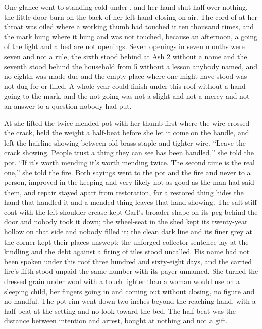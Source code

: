 One glance went to  standing cold under , and her hand shut half over nothing, the little-door burn on the back of her left hand closing on air. The cord of  at her throat was oiled where a working thumb had touched it ten thousand times, and the mark hung where it hung and was not touched, because an afternoon, a going of the light and a bed are not openings. Seven openings in seven months were seven and not a rule, the sixth stood behind at Ash 2 without a name and the seventh stood behind the household from  5 without a lesson anybody named, and no eighth was made due and the empty place where one might have stood was not dug for or filled. A whole year could finish under this roof without a hand going to the mark, and the not-going was not a slight and not a mercy and not an answer to a question nobody had put.

At  she lifted the twice-mended pot with her thumb first where the wire crossed the crack, held the weight a half-beat before she let it come on the handle, and left the hairline showing between old-brass staple and tighter wire. “Leave the crack showing. People trust a thing they can see has been handled,” she told the pot. “If it's worth mending it's worth mending twice. The second time is the real one,” she told the fire. Both sayings went to the pot and the fire and never to a person, improved in the keeping and very likely not as good as the man had said them, and repair stayed apart from restoration, for a restored thing hides the hand that handled it and a mended thing leaves that hand showing. The salt-stiff coat with the left-shoulder crease kept Garl's broader shape on its peg behind the door and nobody took it down; the wheel-seat in the shed kept its twenty-year hollow on that side and nobody filled it; the clean dark line and its finer grey at the corner kept their places unswept; the unforged collector sentence lay at the kindling and the debt against a firing of tiles stood uncalled. His name had not been spoken under this roof three hundred and sixty-eight days, and the carried fire's fifth stood unpaid the same number with its payer unnamed. She turned the dressed grain under wool with a touch lighter than a woman would use on a sleeping child, her fingers going in and coming out without closing, no figure and no handful. The pot rim went down two inches beyond the reaching hand, with a half-beat at the setting and no look toward the bed. The half-beat was the distance between intention and arrest, bought at nothing and not a gift.

